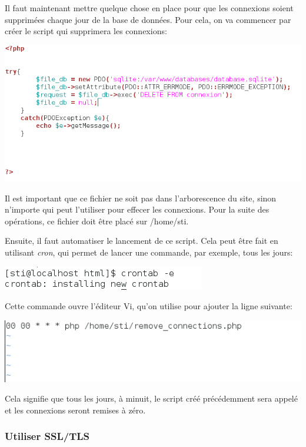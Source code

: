 \documentclass{article}
\begin{document}
Il faut maintenant mettre quelque chose en place pour que les connexions
soient supprimées chaque jour de la base de données. Pour cela, on va
commencer par créer le script qui supprimera les connexions:

\includegraphics{images/tentative_remove_connection.PNG}

Il est important que ce fichier ne soit pas dans l'arborescence du site,
sinon n'importe qui peut l'utiliser pour effecer les connexions. Pour la
suite des opérations, ce fichier doit être placé sur /home/sti.

Ensuite, il faut automatiser le lancement de ce script. Cela peut être
fait en utilisant \emph{cron}, qui permet de lancer une commande, par
exemple, tous les jours:

\includegraphics{images/tentative_crontab.PNG}

Cette commande ouvre l'éditeur Vi, qu'on utilise pour ajouter la ligne
suivante:

\includegraphics{images/tentative_crontab_detail.PNG}

Cela signifie que tous les jours, à minuit, le script créé précédemment
sera appelé et les connexions seront remises à zéro.

\hypertarget{utiliser-ssltls}{%
\subsubsection{Utiliser SSL/TLS}\label{utiliser-ssltls}}
\end{document}

